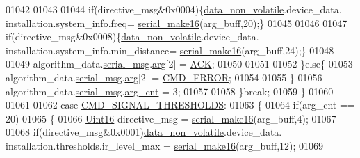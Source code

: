 \begin{DoxyCode}
{{{{{01042                             
01043                                            
01044                             \textcolor{keywordflow}{if}(directive\_msg&0x0004)\{\hyperlink{a00060_a76ac5f917f5308dcd83de0d7c94559fb}{data\_non\_volatile}.device\_data.
      installation.system\_info.freq= \hyperlink{a00031_abc17de32f14103a5be219df0d4ad9176}{serial\_make16}(arg\_buff,20);\}
01045                             
01046                          
01047                             \textcolor{keywordflow}{if}(directive\_msg&0x0008)\{\hyperlink{a00060_a76ac5f917f5308dcd83de0d7c94559fb}{data\_non\_volatile}.device\_data.
      installation.system\_info.min\_distance= \hyperlink{a00031_abc17de32f14103a5be219df0d4ad9176}{serial\_make16}(arg\_buff,24);\}  
01048                             
01049                             algorithm\_data.\hyperlink{a00016_afcf5f557aea688aad985eec15269c1da}{serial\_msg}.\hyperlink{a00031_af7d6f762438c80072bd9dc0e4dd4ae1e}{arg}[2] = \hyperlink{a00021_a6f6489887e08bff4887d0bc5dcf214d8}{ACK};
01050                         
01051                             
01052                           \}\textcolor{keywordflow}{else}\{
01053                             algorithm\_data.\hyperlink{a00016_afcf5f557aea688aad985eec15269c1da}{serial\_msg}.\hyperlink{a00031_af7d6f762438c80072bd9dc0e4dd4ae1e}{arg}[2] = 
      \hyperlink{a00021_a1764a522e9c1a59a59be8757c69fa494}{CMD\_ERROR};
01054 
01055                           \}
01056                             algorithm\_data.\hyperlink{a00016_afcf5f557aea688aad985eec15269c1da}{serial\_msg}.\hyperlink{a00031_a7b79f40e2eeec288091afd340bf8f591}{arg\_cnt} = 3;
01057 
01058                 \}\textcolor{keywordflow}{break};
01059         \}          
01060                             
01061 
01062                 \textcolor{keywordflow}{case}  \hyperlink{a00021_ac361dc1b32c1036394be0fd7de1182ca}{CMD\_SIGNAL\_THRESHOLDS}:
01063                 \{
01064                         \textcolor{keywordflow}{if}(arg\_cnt == 20)
01065                          \{
01066                             \hyperlink{a00072_a59a9f6be4562c327cbfb4f7e8e18f08b}{Uint16} directive\_msg =  \hyperlink{a00031_abc17de32f14103a5be219df0d4ad9176}{serial\_make16}(arg\_buff,4);
01067                             
01068                             \textcolor{keywordflow}{if}(directive\_msg&0x0001)\hyperlink{a00060_a76ac5f917f5308dcd83de0d7c94559fb}{data\_non\_volatile}.device\_data.
      installation.thresholds.ir\_level\_max = \hyperlink{a00031_abc17de32f14103a5be219df0d4ad9176}{serial\_make16}(arg\_buff,12);
01069                             
}}}}}
\end{DoxyCode}
